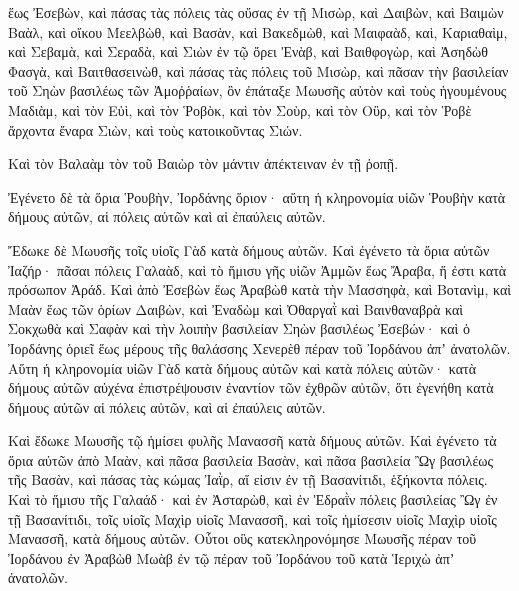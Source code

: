 {ἕως Ἐσεβὼν, καὶ πάσας τὰς πόλεις τὰς οὔσας ἐν τῇ Μισὼρ, καὶ Δαιβὼν, καὶ Βαιμὼν Βαὰλ, καὶ οἴκου Μεελβὼθ,
καὶ Βασὰν, καὶ Βακεδμὼθ, καὶ Μαιφαὰδ, καὶ, Καριαθαὶμ,
καὶ Σεβαμὰ, καὶ Σεραδὰ, καὶ Σιὼν ἐν τῷ ὄρει Ἐνὰβ,
καὶ Βαιθφογὼρ, καὶ Ἀσηδὼθ Φασγὰ, καὶ Βαιτθασεινὼθ,
καὶ πάσας τὰς πόλεις τοῦ Μισὼρ, καὶ πᾶσαν τὴν βασιλείαν τοῦ Σηὼν βασιλέως τῶν Ἀμοῤῥαίων, ὃν ἐπάταξε Μωυσῆς αὐτὸν καὶ τοὺς ἡγουμένους Μαδιὰμ, καὶ τὸν Εὐὶ, καὶ τὸν Ῥοβὸκ, καὶ τὸν Σοὺρ, καὶ τὸν Οὒρ, καὶ τὸν Ῥοβὲ ἄρχοντα ἔναρα Σιὼν, καὶ τοὺς κατοικοῦντας Σιών.
\par }{\PP {}Καὶ τὸν Βαλαὰμ τὸν τοῦ Βαιὼρ τὸν μάντιν ἀπέκτειναν ἐν τῇ ῥοπῇ.
\par }{\PP {}Ἐγένετο δὲ τὰ ὅρια Ῥουβὴν, Ἰορδάνης ὅριον· αὕτη ἡ κληρονομία υἱῶν Ῥουβὴν κατὰ δήμους αὐτῶν, αἱ πόλεις αὐτῶν καὶ αἱ ἐπαύλεις αὐτῶν.
\par }{\PP {}Ἔδωκε δὲ Μωυσῆς τοῖς υἱοῖς Γὰδ κατὰ δήμους αὐτῶν.
Καὶ ἐγένετο τὰ ὅρια αὐτῶν Ἰαζήρ· πᾶσαι πόλεις Γαλαὰδ, καὶ τὸ ἥμισυ γῆς υἱῶν Ἀμμῶν ἕως Ἄραβα, ἥ ἐστι κατὰ πρόσωπον Ἀράδ.
Καὶ ἀπὸ Ἐσεβὼν ἕως Ἀραβὼθ κατὰ τὴν Μασσηφὰ, καὶ Βοτανὶμ, καὶ Μαὰν ἕως τῶν ὁρίων Δαιβὼν,
καὶ Ἐναδὼμ καὶ Ὀθαργαῒ καὶ Βαινθαναβρὰ καὶ Σοκχωθὰ καὶ Σαφὰν καὶ τὴν λοιπὴν βασιλείαν Σηὼν βασιλέως Ἐσεβών· καὶ ὁ Ἰορδάνης ὁριεῖ ἕως μέρους τῆς θαλάσσης Χενερὲθ πέραν τοῦ Ἰορδάνου ἀπʼ ἀνατολῶν.
Αὕτη ἡ κληρονομία υἱῶν Γὰδ κατὰ δήμους αὐτῶν καὶ κατὰ πόλεις αὐτῶν· κατὰ δήμους αὐτῶν αὐχένα ἐπιστρέψουσιν ἐναντίον τῶν ἐχθρῶν αὐτῶν, ὅτι ἐγενήθη κατὰ δήμους αὐτῶν αἱ πόλεις αὐτῶν, καὶ αἱ ἐπαύλεις αὐτῶν.
\par }{\PP {}Καὶ ἔδωκε Μωυσῆς τῷ ἡμίσει φυλῆς Μανασσῆ κατὰ δήμους αὐτῶν.
Καὶ ἐγένετο τὰ ὅρια αὐτῶν ἀπὸ Μαὰν, καὶ πᾶσα βασιλεία Βασὰν, καὶ πᾶσα βασιλεία Ὢγ βασιλέως τῆς Βασὰν, καὶ πάσας τὰς κώμας Ἰαῒρ, αἵ εἰσιν ἐν τῇ Βασανίτιδι, ἑξήκοντα πόλεις.
Καὶ τὸ ἥμισυ τῆς Γαλαάδ· καὶ ἐν Ἀσταρὼθ, καὶ ἐν Ἐδραῒν πόλεις βασιλείας Ὢγ ἐν τῇ Βασανίτιδι, τοῖς υἱοῖς Μαχὶρ υἱοῖς Μανασσῆ, καὶ τοῖς ἡμίσεσιν υἱοῖς Μαχὶρ υἱοῖς Μανασσῆ, κατὰ δήμους αὐτῶν.
Οὗτοι οὓς κατεκληρονόμησε Μωυσῆς πέραν τοῦ Ἰορδάνου ἐν Ἀραβὼθ Μωὰβ ἐν τῷ πέραν τοῦ Ἰορδάνου τοῦ κατὰ Ἱεριχὼ ἀπʼ ἀνατολῶν.

}
